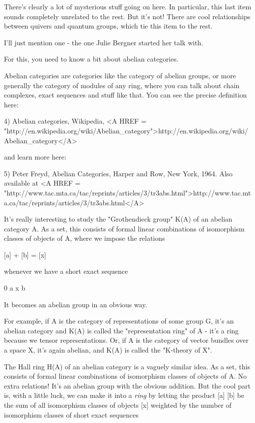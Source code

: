 There's clearly a lot of mysterious stuff going on here.  In
particular, this last item sounds completely unrelated to the 
rest.  But it's not!  There are cool relationships between quivers
and quantum groups, which tie this item to the rest.

I'll just mention one - the one Julie Bergner started her talk with.

For this, you need to know a bit about abelian categories.

Abelian categories are categories like the category of abelian groups,
or more generally the category of modules of any ring, where you can 
talk about chain complexes, exact sequences and stuff like that.  
You can see the precise definition here:

4) Abelian categories, Wikipedia, 
<A HREF = "http://en.wikipedia.org/wiki/Abelian_category">http://en.wikipedia.org/wiki/Abelian_category</A>

and learn more here:

5) Peter Freyd, Abelian Categories, Harper and Row, New York, 1964.
Also available at <A HREF = "http://www.tac.mta.ca/tac/reprints/articles/3/tr3abs.html">http://www.tac.mta.ca/tac/reprints/articles/3/tr3abs.html</A>

It's really interesting to study the "Grothendieck group" K(A) of an 
abelian category A.  As a set, this consists of formal linear combinations 
of isomorphism classes of objects of A, where we impose the relations

[a] + [b] = [x]

whenever we have a short exact sequence

0 \to  a \to  x \to  b 

It becomes an abelian group in an obvious way.

For example, if A is the category of representations of some group G, 
it's an abelian category and K(A) is called the "representation ring" 
of A - it's a ring because we tensor representations.  Or, if A is the 
category of vector bundles over a space X, it's again abelian, and K(A) 
is called the "K-theory of X".  

The Hall ring H(A) of an abelian category is a vaguely similar idea.
As a set, this consists of formal linear combinations of isomorphism
classes of objects of A.  No extra relations!  It's an abelian group 
with the obvious addition.  But the cool part is, with a little luck, 
we can make it into a \emph{ring} by letting the product [a] [b] be the 
sum of all isomorphism classes of objects [x] weighted by the number 
of isomorphism classes of short exact sequences

